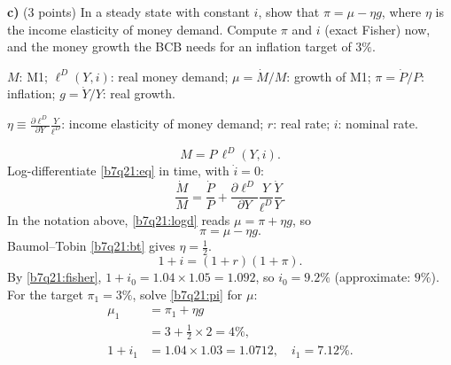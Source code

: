 \textbf{c)} (3 points) In a steady state with constant $i$, show that $\pi=\mu-\eta g$, where $\eta$ is the income elasticity of money
demand. Compute $\pi$ and $i$ (exact Fisher) now, and the money growth the BCB needs for an inflation target of $3\%$.
\resolespaco
\begin{sol}
\begin{notacao}
\item $M$: M1; $\ell^D(Y,i)$: real money demand; $\mu=\dot M/M$: growth of M1; $\pi=\dot P/P$: inflation; $g=\dot Y/Y$: real growth.
\item $\eta\equiv\frac{\partial\ell^D}{\partial Y}\frac{Y}{\ell^D}$: income elasticity of money demand; $r$: real rate; $i$: nominal rate.
\end{notacao}
\begin{equation}
M=P\,\ell^D(Y,i). \label{b7q21:eq}
\end{equation}
Log-differentiate \eqref{b7q21:eq} in time, with $\dot i=0$:
\begin{equation}
\frac{\dot M}M=\frac{\dot P}P+\frac{\partial\ell^D}{\partial Y}\frac{Y}{\ell^D}\frac{\dot Y}Y. \label{b7q21:logd}
\end{equation}
In the notation above, \eqref{b7q21:logd} reads $\mu=\pi+\eta g$, so
\begin{equation}
\pi=\mu-\eta g. \label{b7q21:pi}
\end{equation}
Baumol--Tobin \eqref{b7q21:bt} gives $\eta=\frac12$.
\begin{equation}
1+i=(1+r)(1+\pi). \label{b7q21:fisher}
\end{equation}
By \eqref{b7q21:fisher}, $1+i_0=1.04\times1.05=1.092$, so $i_0=9.2\%$ (approximate: $9\%$). For the target $\pi_1=3\%$, solve \eqref{b7q21:pi} for $\mu$:
\begin{align*}
\mu_1&=\pi_1+\eta g\\
&=3+\tfrac12\times2=4\%,\\
1+i_1&=1.04\times1.03=1.0712,\quad i_1=7.12\%.
\end{align*}
\end{sol}

